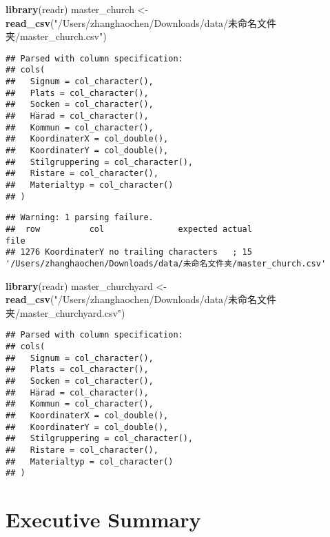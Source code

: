 \documentclass[]{article}
\newenvironment{Shaded}{\begin{snugshade}}{\end{snugshade}}
\newcommand{\KeywordTok}[1]{\textcolor[rgb]{0.13,0.29,0.53}{\textbf{#1}}}
\newcommand{\NormalTok}[1]{#1}
\newcommand{\StringTok}[1]{\textcolor[rgb]{0.31,0.60,0.02}{#1}}
\begin{document}
\begin{Shaded}
\begin{Highlighting}[]
\KeywordTok{library}\NormalTok{(readr)}
\NormalTok{master_church <-}\StringTok{ }\KeywordTok{read_csv}\NormalTok{(}\StringTok{"/Users/zhanghaochen/Downloads/data/未命名文件夹/master_church.csv"}\NormalTok{)}
\end{Highlighting}
\end{Shaded}

\begin{verbatim}
## Parsed with column specification:
## cols(
##   Signum = col_character(),
##   Plats = col_character(),
##   Socken = col_character(),
##   Härad = col_character(),
##   Kommun = col_character(),
##   KoordinaterX = col_double(),
##   KoordinaterY = col_double(),
##   Stilgruppering = col_character(),
##   Ristare = col_character(),
##   Materialtyp = col_character()
## )
\end{verbatim}

\begin{verbatim}
## Warning: 1 parsing failure.
##  row          col               expected actual                                                                file
## 1276 KoordinaterY no trailing characters   ; 15 '/Users/zhanghaochen/Downloads/data/未命名文件夹/master_church.csv'
\end{verbatim}

\begin{Shaded}
\begin{Highlighting}[]
\KeywordTok{library}\NormalTok{(readr)}
\NormalTok{master_churchyard <-}\StringTok{ }\KeywordTok{read_csv}\NormalTok{(}\StringTok{"/Users/zhanghaochen/Downloads/data/未命名文件夹/master_churchyard.csv"}\NormalTok{)}
\end{Highlighting}
\end{Shaded}

\begin{verbatim}
## Parsed with column specification:
## cols(
##   Signum = col_character(),
##   Plats = col_character(),
##   Socken = col_character(),
##   Härad = col_character(),
##   Kommun = col_character(),
##   KoordinaterX = col_double(),
##   KoordinaterY = col_double(),
##   Stilgruppering = col_character(),
##   Ristare = col_character(),
##   Materialtyp = col_character()
## )
\end{verbatim}

\hypertarget{executive-summary}{%
\section{Executive Summary}\label{executive-summary}}
\end{document}
